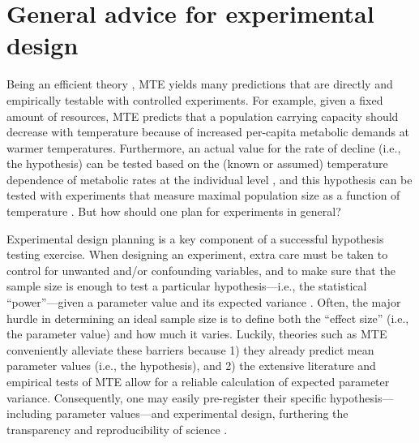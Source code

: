 \documentclass[a4paper,12pt]{article}
\begin{document}
\section{General advice for experimental design}

Being an efficient theory \citep{marquet2014bioscience}, MTE yields many predictions that are directly and empirically testable with controlled experiments. For example, given a fixed amount of resources, MTE predicts that a population carrying capacity should decrease with temperature because of increased per-capita metabolic demands \citep{brown2004ecology, savage2004amnat, barneche2016procb} at warmer temperatures. Furthermore, an actual value for the rate of decline (i.e., the hypothesis) can be tested based on the (known or assumed) temperature dependence of metabolic rates at the individual level \citep[see e.g.,][]{savage2004amnat}, and this hypothesis can be tested with experiments that measure maximal population size as a function of temperature \citep[see e.g.,][and many more examples in the chapter \textbf{``Experimental Approaches in Metabolic Scaling Theory''}]{bernhardt2018amnat, bernhardt2018procb}. But how should one plan for experiments in general?

Experimental design planning is a key component of a successful hypothesis testing exercise. When designing an experiment, extra care must be taken to control for unwanted and/or confounding variables, and to make sure that the sample size is enough to test a particular hypothesis---i.e., the statistical ``power''---given a parameter value and its expected variance \citep{gelman2020book}. Often, the major hurdle in determining an ideal sample size is to define both the ``effect size'' (i.e., the parameter value) and how much it varies. Luckily, theories such as MTE conveniently alleviate these barriers because 1) they already predict mean parameter values (i.e., the hypothesis), and 2) the extensive literature and empirical tests of MTE allow for a reliable calculation of expected parameter variance. Consequently, one may easily pre-register their specific hypothesis---including parameter values---and experimental design, furthering the transparency and reproducibility of science \citep{odea2021bmcbiol}.
\end{document}
